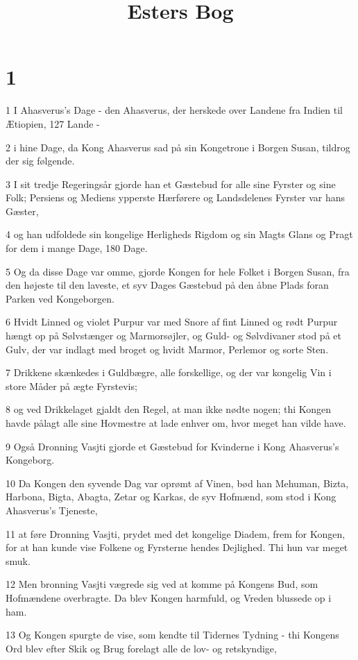 

\title{Esters Bog}


\chapter{1}

\par 1 I Ahasverus's Dage - den Ahasverus, der herskede over Landene fra Indien til Ætiopien, 127 Lande -
\par 2 i hine Dage, da Kong Ahasverus sad på sin Kongetrone i Borgen Susan, tildrog der sig følgende.
\par 3 I sit tredje Regeringsår gjorde han et Gæstebud for alle sine Fyrster og sine Folk; Persiens og Mediens ypperste Hærførere og Landsdelenes Fyrster var hans Gæster,
\par 4 og han udfoldede sin kongelige Herligheds Rigdom og sin Magts Glans og Pragt for dem i mange Dage, 180 Dage.
\par 5 Og da disse Dage var omme, gjorde Kongen for hele Folket i Borgen Susan, fra den højeste til den laveste, et syv Dages Gæstebud på den åbne Plads foran Parken ved Kongeborgen.
\par 6 Hvidt Linned og violet Purpur var med Snore af fint Linned og rødt Purpur hængt op på Sølvstænger og Marmorsøjler, og Guld- og Sølvdivaner stod på et Gulv, der var indlagt med broget og hvidt Marmor, Perlemor og sorte Sten.
\par 7 Drikkene skænkedes i Guldbægre, alle forskellige, og der var kongelig Vin i store Måder på ægte Fyrstevis;
\par 8 og ved Drikkelaget gjaldt den Regel, at man ikke nødte nogen; thi Kongen havde pålagt alle sine Hovmestre at lade enhver om, hvor meget han vilde have.
\par 9 Også Dronning Vasjti gjorde et Gæstebud for Kvinderne i Kong Ahasverus's Kongeborg.
\par 10 Da Kongen den syvende Dag var oprømt af Vinen, bød han Mehuman, Bizta, Harbona, Bigta, Abagta, Zetar og Karkas, de syv Hofmænd, som stod i Kong Ahasverus's Tjeneste,
\par 11 at føre Dronning Vasjti, prydet med det kongelige Diadem, frem for Kongen, for at han kunde vise Folkene og Fyrsterne hendes Dejlighed. Thi hun var meget smuk.
\par 12 Men bronning Vasjti vægrede sig ved at komme på Kongens Bud, som Hofmændene overbragte. Da blev Kongen harmfuld, og Vreden blussede op i ham.
\par 13 Og Kongen spurgte de vise, som kendte til Tidernes Tydning - thi Kongens Ord blev efter Skik og Brug forelagt alle de lov- og retskyndige,

